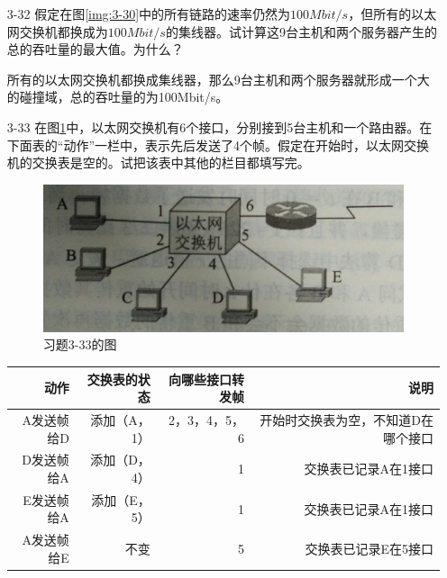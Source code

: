 \documentclass[a4paper,UTF8]{article}
\begin{document}
\begin{enumerate}
\item[3-32] 假定在图\ref{img:3-30}中的所有链路的速率仍然为$100Mbit/s$，但所有的以太网交换机都换成为$100Mbit/s$的集线器。试计算这9台主机和两个服务器产生的总的吞吐量的最大值。为什么？ 
\begin{solution}
    所有的以太网交换机都换成集线器，那么9台主机和两个服务器就形成一个大的碰撞域，总的吞吐量的为100Mbit/s。
\end{solution}

\item[3-33] 在图\ref{img:3-33}中，以太网交换机有6个接口，分别接到5台主机和一个路由器。在下面表的“动作”一栏中，表示先后发送了4个帧。假定在开始时，以太网交换机的交换表是空的。试把该表中其他的栏目都填写完。
\begin{figure}[htbp]
    \centering
    \includegraphics[scale=0.10]{3-33}
    \caption{习题3-33的图}
    \label{img:3-33}
\end{figure}
\begin{table}[H]
		\begin{tabular}{|rrrr|}
			\hline
			动作 & 交换表的状态 & 向哪些接口转发帧 & 说明 \\
			\hline
            A发送帧给D & 添加（A，1） & 2，3，4，5，6 & 开始时交换表为空，不知道D在哪个接口 \\
            \hline
			D发送帧给A & 添加（D，4） & 1 & 交换表已记录A在1接口 \\
            \hline
            E发送帧给A & 添加（E，5） & 1 & 交换表已记录A在1接口 \\
            \hline
            A发送帧给E & 不变 & 5 & 交换表已记录E在5接口 \\
			\hline
		\end{tabular}
	\end{table}
\end{enumerate}
\end{document}
